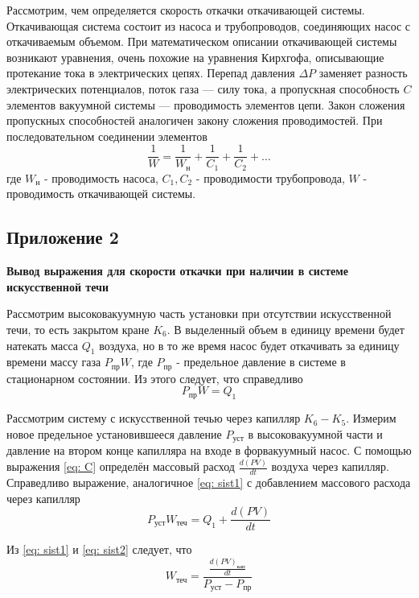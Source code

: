 Рассмотрим, чем определяется скорость откачки откачивающей системы. Откачивающая система состоит из насоса и трубопроводов, соединяющих насос с откачиваемым объемом. При математическом описании откачивающей системы возникают уравнения, очень похожие на уравнения Кирхгофа, описывающие
протекание тока в электрических цепях. Перепад давления $\Delta P$ заменяет разность электрических потенциалов, поток газа — силу тока,
а пропускная способность $C$ элементов вакуумной системы — проводимость элементов цепи. Закон сложения пропускных способностей аналогичен закону сложения проводимостей. При последовательном соединении элементов
\begin{equation}
    \frac{1}{W} = \frac{1}{W_\text{н}} + \frac{1}{C_1} + \frac{1}{C_2} + \dots \label{eq: kirh}
\end{equation}
где $W_\text{н}$ - проводимость насоса, $C_1, C_2$ - проводимости трубопровода, 
$W$ - проводимость откачивающей системы.

\newpage
\subsection{Приложение 2} \label{Приложение 2}
\textbf{Вывод выражения для скорости откачки при наличии в системе искусственной течи}

Рассмотрим высоковакуумную часть установки при отсутствии искусственной течи, то есть закрытом кране $K_6$. В выделенный объем в единицу времени будет натекать масса $Q_1$ воздуха, но в то же время насос будет откачивать за единицу времени массу газа $P_\text{пр}W$, где $P_\text{пр}$ - предельное давление в системе в стационарном состоянии. Из этого следует, что справедливо
\begin{equation}
    P_\text{пр}W = Q_1 \label{eq: sist1}
\end{equation}

Рассмотрим систему с искусственной течью через капилляр $K_6-K_5$. Измерим новое предельное установившееся давление $P_\text{уст}$ в высоковакуумной части и давление на втором конце капилляра на входе в форвакуумный насос. С помощью выражения \eqref{eq: C} определён массовый расход $\frac{d(PV)}{dt}$ воздуха через капилляр. Справедливо выражение, аналогичное \eqref{eq: sist1} с добавлением массового расхода через капилляр
\begin{equation}
    P_\text{уст}W_\text{теч} = Q_1  + \frac{d(PV)}{dt} \label{eq: sist2}
\end{equation}

Из \eqref{eq: sist1} и \eqref{eq: sist2} следует, что 
\begin{equation}
    W_\text{теч} = \frac{\frac{d(PV)_\text{кап}}{dt}}{P_\text{уст} - P_\text{пр}}
\end{equation}
\newpage
